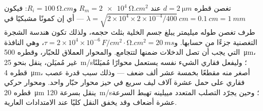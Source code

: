 \begin{example}\label{ex:b3:nervous-systems:numbers}
تغصن قطره $d = \qty{2}{\micro m}$ عند $R_{m} = \qty{2e4}{\ohm.cm^2}$
و$R_{i} = \qty{100}{\ohm.cm}$: فيكون $\lambda = \sqrt{2\times 10^{4}\times
2\times 10^{-4}/400}\ \unit{cm} = \qty{0.1}{cm} = \qty{1}{mm}$ --- أي
إن كمونًا مشبكيًا في طرف تغصن طوله ميليمتر يبلغ جسم الخلية
بثلث حجمه، ولذلك تكون هندسة الشجرة التغصنية جزءًا من
حسابها. و$\tau = 2\times 10^{4}\times
10^{-6}\,\unit{F/cm^2}\cdot\unit{\ohm.cm^2} = \qty{20}{ms}$، وهي النافذة
التي يجب أن تصل الدخلات ضمنها لتتجامع. والمحوار العملاق
للحبّار، وقطره \qty{500}{\micro m}، غير مُميَلن، ينقل بنحو
\qty{25}{m/s}؛ وليفعل فقاري الشيء نفسه يستعمل محوارًا
مُميَلنًا قطره \qty{4}{\micro m}، أصغر منه مقطعًا بخمسة عشر
ألف ضعف --- وذلك سبب قدرة عصب فقاري على حمل عشرة آلاف ليف
سريع في حيز محوار حبّار واحد. ومحوار حركي قطره
\qty{20}{\micro m} ينقل بسرعة \qty{120}{m/s}؛ وحين يجرّد
التصلب المتعدد مييلينه تهبط السرعة عشرة أضعاف وقد يخفق
النقل كليًا عند الامتدادات العارية.
\end{example}

